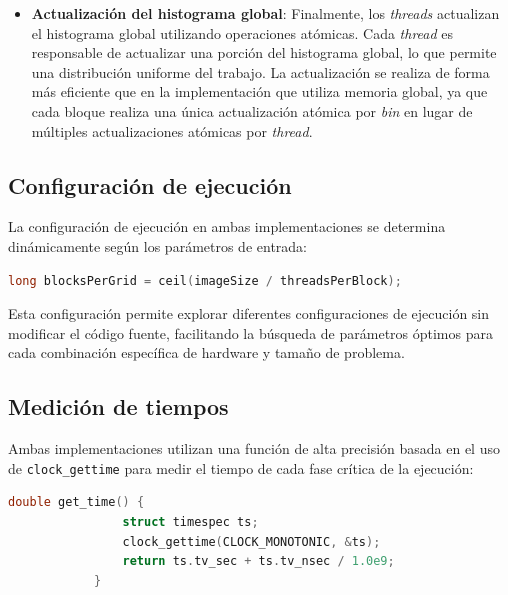 \begin{itemize}
                \item \textbf{Actualización del histograma global}: Finalmente, los \textit{threads} actualizan el histograma global utilizando operaciones atómicas. Cada \textit{thread} es responsable de actualizar una porción del histograma global, lo que permite una distribución uniforme del trabajo. La actualización se realiza de forma más eficiente que en la implementación que utiliza memoria global, ya que cada bloque realiza una única actualización atómica por \textit{bin} en lugar de múltiples actualizaciones atómicas por \textit{thread}.
                
            \end{itemize}
            
    \subsection{Configuración de ejecución}
    
        La configuración de ejecución en ambas implementaciones se determina dinámicamente según los parámetros de entrada:
        
        \begin{lstlisting}[language=C, caption={Calculo de las dimensiones del \textit{grid}.}, gobble=12]
            long blocksPerGrid = ceil(imageSize / threadsPerBlock);
        \end{lstlisting}
        
        Esta configuración permite explorar diferentes configuraciones de ejecución sin modificar el código fuente, facilitando la búsqueda de parámetros óptimos para cada combinación específica de hardware y tamaño de problema.
        
    \subsection{Medición de tiempos}
    
        Ambas implementaciones utilizan una función de alta precisión basada en el uso de \texttt{clock\_gettime} para medir el tiempo de cada fase crítica de la ejecución:
        
        \begin{lstlisting}[language=C, caption={Función de medición de tiempo.}, gobble=12]
            double get_time() {
                struct timespec ts;
                clock_gettime(CLOCK_MONOTONIC, &ts);
                return ts.tv_sec + ts.tv_nsec / 1.0e9;
            }
        \end{lstlisting}
    
